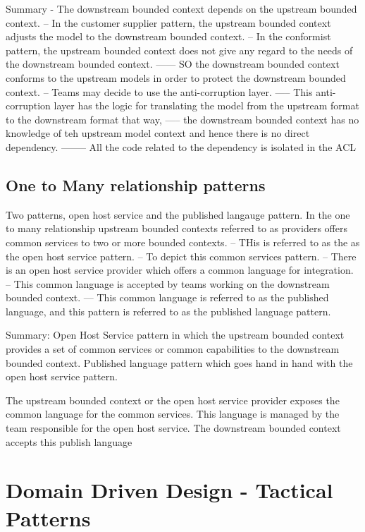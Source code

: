 \documentclass[a4paper, 11pt]{book}
\begin{document}
    Summary
    - The downstream bounded context depends on the upstream bounded context.
    -- In the customer supplier pattern, the upstream bounded context adjusts the model to the downstream bounded context.
    -- In the conformist pattern, the upstream bounded context does not give any regard to the needs of the downstream bounded context.
    ------ SO the downstream bounded context conforms to the upstream models in order to protect the downstream bounded context.
    -- Teams may decide to use the anti-corruption layer.
    ----- This anti-corruption layer has the logic for translating the model from the upstream format to the downstream format that way,
    ----- the downstream bounded context has no knowledge of teh upstream model context and hence there is no direct dependency.
    -------- All the code related to the dependency is isolated in the ACL


    \section{One to Many relationship patterns}

    Two patterns, open host service and the published langauge pattern.
    In the one to many relationship upstream bounded contexts referred to as providers offers common services to two or more bounded contexts.
    -- THis is referred to as the as the open host service pattern.
    -- To depict this common services pattern.
    -- There is an open host service provider which offers a common language for integration.
    -- This common language is accepted by teams working on the downstream bounded context.
    --- This common language is referred to as the published language, and this pattern is referred to as the published language pattern.

    Summary:
    Open Host Service pattern in which the upstream bounded context provides a set of common services or common capabilities to the downstream bounded context.
    Published language pattern which goes hand in hand with the open host service pattern.

    The upstream bounded context or the open host service provider exposes the common language for the common services.
    This language is managed by the team responsible for the open host service.
    The downstream bounded context accepts this publish language


    \chapter{Domain Driven Design - Tactical Patterns}
\end{document}
